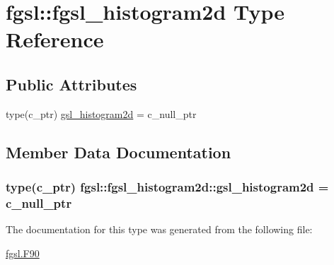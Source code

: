 \hypertarget{structfgsl_1_1fgsl__histogram2d}{}\section{fgsl\+:\+:fgsl\+\_\+histogram2d Type Reference}
\label{structfgsl_1_1fgsl__histogram2d}
\subsection*{Public Attributes}
\begin{DoxyCompactItemize}
\item 
type(c\+\_\+ptr) \hyperlink{structfgsl_1_1fgsl__histogram2d_a9cb2cbcab12a56f1b458247180418670}{gsl\+\_\+histogram2d} = c\+\_\+null\+\_\+ptr
\end{DoxyCompactItemize}


\subsection{Member Data Documentation}
\hypertarget{structfgsl_1_1fgsl__histogram2d_a9cb2cbcab12a56f1b458247180418670}{}
\subsubsection[{gsl\+\_\+histogram2d}]{\setlength{\rightskip}{0pt plus 5cm}type(c\+\_\+ptr) fgsl\+::fgsl\+\_\+histogram2d\+::gsl\+\_\+histogram2d = c\+\_\+null\+\_\+ptr}\label{structfgsl_1_1fgsl__histogram2d_a9cb2cbcab12a56f1b458247180418670}


The documentation for this type was generated from the following file\+:\begin{DoxyCompactItemize}
\item 
\hyperlink{fgsl_8F90}{fgsl.\+F90}\end{DoxyCompactItemize}
